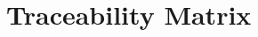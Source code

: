\documentclass[12pt, titlepage]{article}
\newcommand{\mref}[1]{M\ref{#1}}
\begin{document}






\section{Traceability Matrix} \label{SecTM}
\end{document}
